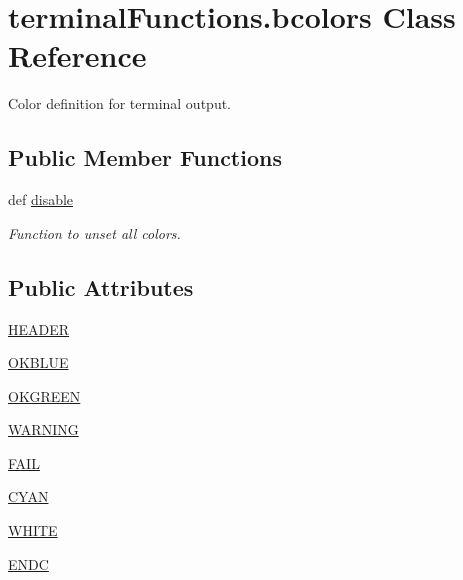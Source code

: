 \section{terminal\-Functions.\-bcolors Class Reference}
\label{classterminalFunctions_1_1bcolors}


Color definition for terminal output.  


\subsection*{Public Member Functions}
\begin{DoxyCompactItemize}
\item 
def \hyperlink{classterminalFunctions_1_1bcolors_a9a1a936047fe2c05ed14be7681d35414}{disable}
\begin{DoxyCompactList}\small\item\em Function to unset all colors. \end{DoxyCompactList}\end{DoxyCompactItemize}
\subsection*{Public Attributes}
\begin{DoxyCompactItemize}
\item 
\hyperlink{classterminalFunctions_1_1bcolors_ac0db122b06aed29f375c132f37236939}{H\-E\-A\-D\-E\-R}
\item 
\hyperlink{classterminalFunctions_1_1bcolors_aed2d2a9a28de0cada29ff01166af9df8}{O\-K\-B\-L\-U\-E}
\item 
\hyperlink{classterminalFunctions_1_1bcolors_a62488aca613ba27f27a4725bbf1a5a26}{O\-K\-G\-R\-E\-E\-N}
\item 
\hyperlink{classterminalFunctions_1_1bcolors_ad7b2abb068f6d284e8f067bbdaf57775}{W\-A\-R\-N\-I\-N\-G}
\item 
\hyperlink{classterminalFunctions_1_1bcolors_a9a522043fb1ab7e81ceeb3a689a11307}{F\-A\-I\-L}
\item 
\hyperlink{classterminalFunctions_1_1bcolors_a38d011aa5f0b2133e4ca07d7e730d4e8}{C\-Y\-A\-N}
\item 
\hyperlink{classterminalFunctions_1_1bcolors_ad40bf7cbe951ff7023120aebb45b4d1b}{W\-H\-I\-T\-E}
\item 
\hyperlink{classterminalFunctions_1_1bcolors_a890664d0d57f3c17ff7d978ada2a7237}{E\-N\-D\-C}
\end{DoxyCompactItemize}
